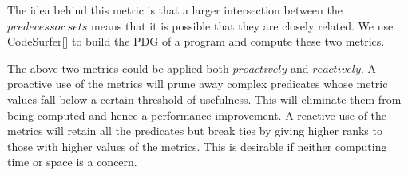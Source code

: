 The idea behind this metric is that a larger intersection between the $predecessor\ sets$ means that it is possible that they are closely related.  We use CodeSurfer[] to build the PDG of a program and compute these two metrics.

The above two metrics could be applied both $proactively$ and $reactively$.  A proactive use of the metrics will prune away complex predicates whose metric values fall below a certain threshold of usefulness.  This will eliminate them from being computed and hence a performance improvement.  A reactive use of the metrics will retain all the predicates but break ties by giving higher ranks to those with higher values of the metrics. This is desirable if neither computing time or space is a concern.


